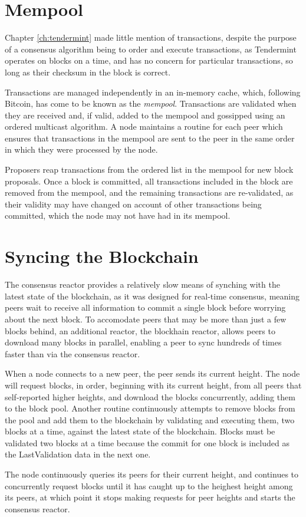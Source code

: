 \section{Mempool}

Chapter \ref{ch:tendermint} made little mention of transactions, 
despite the purpose of a consensus algorithm being to order and execute transactions,
as Tendermint operates on blocks on a time, and has no concern for particular transactions,
so long as their checksum in the block is correct.

Transactions are managed independently in an in-memory cache, 
which, following Bitcoin, has come to be known as the \emph{mempool}.
Transactions are validated when they are received and, if valid, 
added to the mempool and gossipped using an ordered multicast algorithm.
A node maintains a routine for each peer which ensures that transactions 
in the mempool are sent to the peer in the same order in which they were processed by the node.

Proposers reap transactions from the ordered list in the mempool for new block proposals.
Once a block is committed, all transactions included in the block are removed from the mempool,
and the remaining transactions are re-validated,
as their validity may have changed on account of other transactions being committed, 
which the node may not have had in its mempool.

\section{Syncing the Blockchain}

The consensus reactor provides a relatively slow means of synching with the latest state of the blockchain,
as it was designed for real-time consensus,
meaning peers wait to receive all information to commit a single block before worrying about the next block.
To accomodate peers that may be more than just a few blocks behind, 
an additional reactor, the blockhain reactor, allows peers to download many blocks in parallel,
enabling a peer to sync hundreds of times faster than via the consensus reactor.

When a node connects to a new peer, the peer sends its current height.
The node will request blocks, in order, beginning with its current height,
from all peers that self-reported higher heights, and download the blocks concurrently, adding them to the block pool.
Another routine continuously attempts to remove blocks from the pool and add them to the blockchain by validating and executing them, 
two blocks at a time, against the latest state of the blockchain.
Blocks must be validated two blocks at a time because the commit for one block is included as the LastValidation data in the next one.

The node continuously queries its peers for their current height, 
and continues to concurrently request blocks until it has caught up to the heighest height among its peers, 
at which point it stops making requests for peer heights and starts the consensus reactor.

